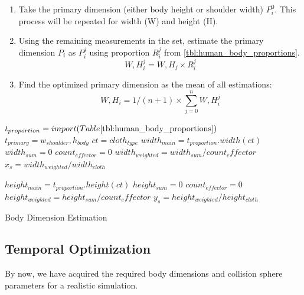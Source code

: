 \documentclass[twocolumn]{svjour3}          %
\begin{document}
\begin{enumerate}
\item Take the primary dimension (either body height or shoulder width) $P_i^0$. This process will be repeated for width (W) and height (H).
\item Using the remaining measurements in the set,  estimate the primary dimension $P_i$ as $P_i^j$ using proportion $R_i^j$ from \ref{tbl:human_body_proportions}.
\begin{equation}
W,H_i^j=W,H_j \times R_i^j
\label{eqn:proportion_estimation}
\end{equation}
\item Find the optimized primary dimension as the mean of all estimations:
\begin{equation}
W,H_i=1/(n+1) \times \sum\limits_{j=0}^n W,H_i^j
\label{eqn:optimized_parameter}
\end{equation}
\end{enumerate}

\begin{algorithm}
\dontprintsemicolon %

$t_{proportion}=import(Table \ref{tbl:human_body_proportions})$ \;
$t_{primary}=w_{shoulder},h_{body}$ \;
$ct=cloth_{type}$\;
$width_{main}=t_{proportion}.width(ct)$\;
$width_{sum}=0$\;
$count_{effector}=0$\;
$width_{weighted}=width_{sum}/count_effector$
$x_s=width_{weighted}/width_{cloth}$\;

$height_{main}=t_{proportion}.height(ct)$\;
$height_{sum}=0$\;
$count_{effector}=0$\;
$height_{weighted}=height_{sum}/count_effector$
$y_s=height_{weighted}/height_{cloth}$\;
\caption{Body Dimension Estimation}
\label{algo:cloth_resize}
\end{algorithm}

\subsection{Temporal Optimization}
\label{subsec:3.3}

By now, we have acquired the required body dimensions and collision sphere parameters for a realistic simulation. 
\end{document}
